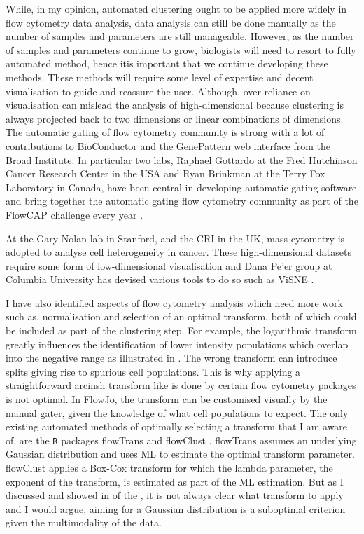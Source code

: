 While, in my opinion, automated clustering ought to be applied more widely in flow cytometry data analysis, data analysis can still be done manually as the number of samples and parameters are still manageable.
However, as the number of samples and parameters continue to grow, biologists will need to resort to fully automated method, hence itis important that we continue developing these methods.
These methods will require some level of expertise and decent visualisation to guide and reassure the user.
Although, over-reliance on visualisation can mislead the analysis of high-dimensional because clustering is always projected back to two dimensions or linear combinations of dimensions.
The automatic gating of flow cytometry community is strong with a lot of contributions to BioConductor and the GenePattern web interface from the Broad Institute.
In particular two labs, Raphael Gottardo at the Fred Hutchinson Cancer Research Center in the USA and Ryan Brinkman at the Terry Fox Laboratory in Canada, have been central in developing automatic gating software and bring together the automatic gating flow cytometry community as part of the FlowCAP challenge every year \citep{Aghaeepour:2013dg}.

At the Gary Nolan lab in Stanford, and the CRI in the UK, mass cytometry is adopted to analyse cell heterogeneity in cancer.
These high-dimensional datasets require some form of low-dimensional visualisation and Dana Pe'er group at Columbia University has devised various tools to do so such as ViSNE \citep{Amir:2013jp}.

I have also identified aspects of flow cytometry analysis which need more work such as, normalisation and selection of an optimal transform, both of which could be included as part of the clustering step.
For example, the logarithmic transform greatly influences the identification of lower intensity populations which overlap into the negative range as illustrated in .
The wrong transform can introduce splits giving rise to spurious cell populations.
This is why applying a straightforward arcinsh transform like is done by certain flow cytometry packages is not optimal.
In FlowJo, the transform can be customised visually by the manual gater, given the knowledge of what cell populations to expect.
The only existing automated  methods of optimally selecting a transform that I am aware of, are the \texttt{R} packages \textsf{flowTrans} and \textsf{flowClust} \citep{flowTrans,flowClust}.
\textsf{flowTrans} assumes an underlying Gaussian distribution and uses \gls{ML} to estimate the optimal transform parameter.
\textsf{flowClust} applies a Box-Cox transform for which the lambda parameter, the exponent of the transform, is estimated as part of the \gls{ML} estimation.
But as I discussed and showed in  of the , it is not always clear what transform to apply and I would argue, aiming for a Gaussian distribution is a suboptimal criterion given the multimodality of the data.

